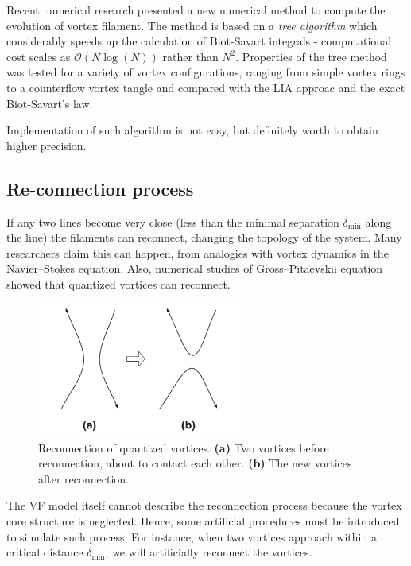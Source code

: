 Recent numerical research presented \cite{tree_alg} a new numerical method to compute the evolution of vortex filament. The method is based on a \textit{tree algorithm} which considerably speeds up the calculation of Biot-Savart integrals - computational cost scales as $\mathcal{O}(N \log(N))$ rather than $N^2$. Properties of the tree method was tested for a variety of vortex configurations, ranging from simple vortex rings to a counterflow vortex tangle and compared with the LIA approac and the exact Biot-Savart's law.

Implementation of such algorithm is not easy, but definitely worth to obtain higher precision.


\subsection*{Re-connection process}

If any two lines become very close (less than the minimal separation $\delta_{\text{min}}$ along the line) the filaments can reconnect, changing the topology of the system. Many researchers claim this can happen, from analogies with vortex dynamics in the Navier–Stokes equation. Also, numerical studies of Gross–Pitaevskii equation showed that quantized vortices can reconnect.

\begin{figure}[h]
	\centering
	\includegraphics[width=0.6\textwidth]{graphics/simul/reconnection}
	\caption{Reconnection of quantized vortices. \textbf{(a)} Two vortices before reconnection, about to contact each other. \textbf{(b)} The new vortices after reconnection.}
\end{figure}

The VF model itself cannot describe the reconnection process because the vortex core structure is neglected. Hence, some artificial procedures must be introduced to simulate such process. For instance, when two vortices approach within a critical distance $\delta_{\text{min}}$, we will artificially reconnect the vortices.

